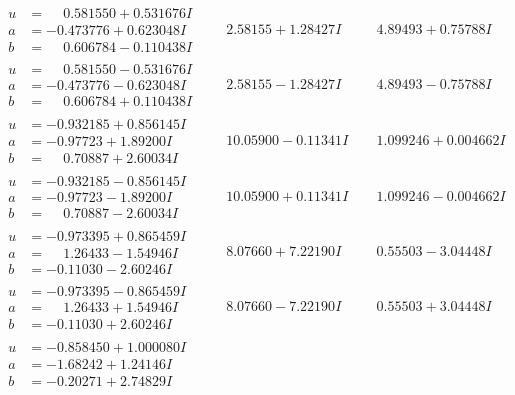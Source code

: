 \documentclass[1p]{elsarticle_modified}
\theoremstyle{definition}
\begin{document}
$$\begin{array}{c|c|c}
\begin{aligned}
u &= \phantom{-}0.581550 + 0.531676 I \\
a &= -0.473776 + 0.623048 I \\
b &= \phantom{-}0.606784 - 0.110438 I\end{aligned}
 & \phantom{-}2.58155 + 1.28427 I & \phantom{-}4.89493 + 0.75788 I \\ \hline\begin{aligned}
u &= \phantom{-}0.581550 - 0.531676 I \\
a &= -0.473776 - 0.623048 I \\
b &= \phantom{-}0.606784 + 0.110438 I\end{aligned}
 & \phantom{-}2.58155 - 1.28427 I & \phantom{-}4.89493 - 0.75788 I \\ \hline\begin{aligned}
u &= -0.932185 + 0.856145 I \\
a &= -0.97723 + 1.89200 I \\
b &= \phantom{-}0.70887 + 2.60034 I\end{aligned}
 & \phantom{-}10.05900 - 0.11341 I & \phantom{-}1.099246 + 0.004662 I \\ \hline\begin{aligned}
u &= -0.932185 - 0.856145 I \\
a &= -0.97723 - 1.89200 I \\
b &= \phantom{-}0.70887 - 2.60034 I\end{aligned}
 & \phantom{-}10.05900 + 0.11341 I & \phantom{-}1.099246 - 0.004662 I \\ \hline\begin{aligned}
u &= -0.973395 + 0.865459 I \\
a &= \phantom{-}1.26433 - 1.54946 I \\
b &= -0.11030 - 2.60246 I\end{aligned}
 & \phantom{-}8.07660 + 7.22190 I & \phantom{-}0.55503 - 3.04448 I \\ \hline\begin{aligned}
u &= -0.973395 - 0.865459 I \\
a &= \phantom{-}1.26433 + 1.54946 I \\
b &= -0.11030 + 2.60246 I\end{aligned}
 & \phantom{-}8.07660 - 7.22190 I & \phantom{-}0.55503 + 3.04448 I \\ \hline\begin{aligned}
u &= -0.858450 + 1.000080 I \\
a &= -1.68242 + 1.24146 I \\
b &= -0.20271 + 2.74829 I\end{aligned}

\end{array}$$
\end{document}
